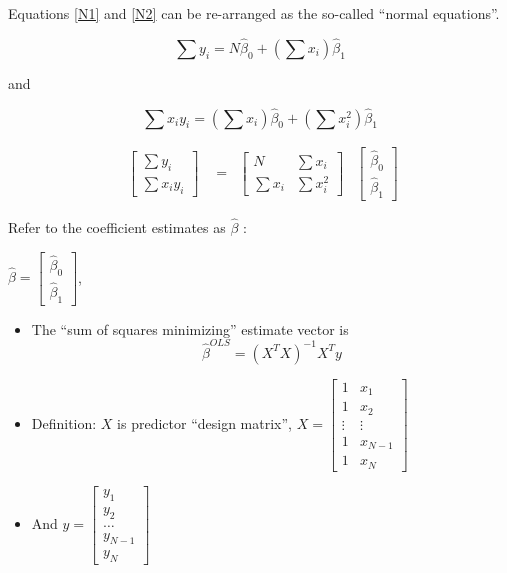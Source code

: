 \documentclass[10pt,english]{beamer}
\def\lyxframeend{} %
\begin{document}
\lyxframeend{}

Equations \ref{N1} and \ref{N2} can be re-arranged as the so-called
``normal equations''.

\[
\sum y_{i}=N\hat{\beta}_{0}+\left(\sum x_{i}\right)\hat{\beta}_{1}
\]


and

\[
\sum x_{i}y_{i}=\left(\sum x_{i}\right)\hat{\beta}_{0}+\left(\sum x_{i}^{2}\right)\hat{\beta}_{1}
\]



\lyxframeend{}

\begin{equation}
\begin{array}{cccc}
\begin{array}{c}
\left[\begin{array}{c}
\sum y_{i}\\
\sum x_{i}y_{i}
\end{array}\right]\end{array} & = & \left[\begin{array}{cc}
N & \sum x_{i}\\
\sum x_{i} & \sum x_{i}^{2}
\end{array}\right] & \left[\begin{array}{c}
\hat{\beta}_{0}\\
\hat{\beta}_{1}
\end{array}\right]\end{array}\label{matrix}
\end{equation}


Refer to the coefficient estimates as $\hat{\beta}$ :

$\hat{\beta}=\left[\begin{array}{c}
\hat{\beta}_{0}\\
\hat{\beta}_{1}
\end{array}\right]$, 


\lyxframeend{}
\begin{itemize}
\item The ``sum of squares minimizing'' estimate vector is
\begin{equation}
\hat{\beta}^{OLS}=(X^{T}X)^{-1}X^{T}y
\end{equation}

\item Definition: $X$ is predictor ``design matrix'', $X=\left[\begin{array}{cc}
1 & x_{1}\\
1 & x_{2}\\
\vdots & \vdots\\
1 & x_{N-1}\\
1 & x_{N}
\end{array}\right]$
\item And $y=\left[\begin{array}{c}
y_{1}\\
y_{2}\\
\ldots\\
y_{N-1}\\
y_{N}
\end{array}\right]$
\end{itemize}

\lyxframeend{}
\end{document}
